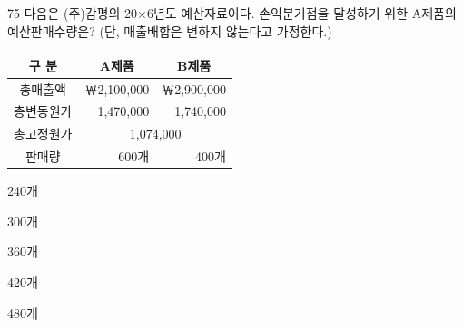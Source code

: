 \begin{question}{75}
다음은 (주)감평의 20×6년도 예산자료이다. 손익분기점을 달성하기 위한 A제품의 예산판매수량은? (단, 매출배합은 변하지 않는다고 가정한다.)

{\small\centering
\begin{tabular}{|c|r|r|}\hline
구 분 & \multicolumn{1}{c|}{A제품} & \multicolumn{1}{c|}{B제품} \\ \hline
총매출액 & ￦2,100,000 & ￦2,900,000 \\ \hline
총변동원가 & 1,470,000 & 1,740,000 \\ \hline
총고정원가 & \multicolumn{2}{c|}{1,074,000} \\ \hline
판매량 & 600개 & 400개 \\ \hline
\end{tabular}\par}
\begin{choices}
  \item 240개
  \item 300개
  \item 360개
  \item 420개
  \item 480개
\end{choices}
\end{question}
